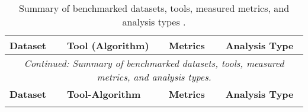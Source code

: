 \begin{longtable}{llll}
\caption[Summary of benchmarked datasets, tools, measured metrics, and analysis types.]{Summary of benchmarked datasets, tools, measured metrics, and analysis types \cite{earthperson_dataset_2023}.}
\label{tab:what_was_benchmarked}\\
\toprule
\textbf{Dataset} & \textbf{Tool (Algorithm)} & \textbf{Metrics} & \textbf{Analysis Type} \\
\midrule
\endfirsthead
\multicolumn{4}{c}{\textit{Continued: Summary of benchmarked datasets, tools, measured metrics, and analysis types.}}\\
\toprule
\textbf{Dataset} & \textbf{Tool-Algorithm} & \textbf{Metrics} & \textbf{Analysis Type} \\
\midrule
\endhead
%
\bottomrule
\endfoot
%
\endlastfoot


\end{longtable}
